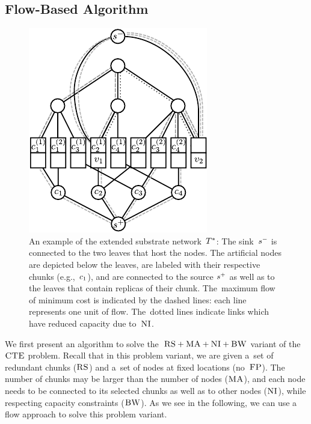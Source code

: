 \subsection{Flow-Based Algorithm}\label{ssec:flow}

\begin{figure}
\centering
\includegraphics[width=0.5\columnwidth]{figs/static-mapping/flow_ma_cv}
\caption{An example of the extended substrate
network~$T^*$: The sink~$s^{-}$ is connected to the two leaves that host the
nodes. The artificial nodes are depicted below the leaves, are labeled with
their respective chunks (e.g.,~$c_1$), and are connected to the source
$s^{+}$ as well as to the leaves that contain replicas of their chunk.
The~maximum flow of minimum cost is indicated by the dashed lines: each line
represents one unit of flow. The~dotted lines indicate links which have reduced
capacity due to~$\textsc{NI}$.}
\label{fig:flow_construction}
\end{figure}





We first present an algorithm to solve the~$\textsc{RS}+\textsc{MA}+\textsc{NI}+\textsc{BW}$ variant of the $\textsc{CTE}$ problem.
Recall that in this problem variant,
we are given a~set of redundant chunks ($\textsc{RS}$) and a~set of
nodes
at fixed locations (no~$\textsc{FP}$). The number of chunks may be larger than the number
of nodes ($\textsc{MA}$), and each node needs to be connected
to its selected chunks as well as to other nodes ($\textsc{NI}$), while respecting
capacity constraints ($\textsc{BW}$).
As we see in the following, we can use a flow approach to solve this
problem variant.


